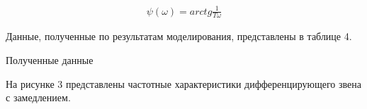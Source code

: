\documentclass[a4paper, 11pt]{article}
\begin{document}
\begin{align}
	\psi(\omega)=arctg\frac{1}{T\omega}
\end{align}

\par 
Данные, полученные по результатам моделирования, представлены в таблице 4.

\newpage
\begin{table}[h!]
\centering
    \begin{threeparttable}
        \caption{Полученные данные} \label{tab:perflogcross}
    \end{threeparttable}
\end{table}

\newpage
\par 
На рисунке 3 представлены частотные характеристики дифференцирующего звена с замедлением.
\end{document}

